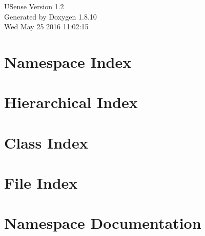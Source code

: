 \documentclass[twoside]{book}
\newcommand{\+}{\discretionary{\mbox{\scriptsize$\hookleftarrow$}}{}{}}
\newcommand{\clearemptydoublepage}{%
  \newpage{\pagestyle{empty}\cleardoublepage}%
}
\begin{document}
\hypersetup{pageanchor=false,
             bookmarks=true,
             bookmarksnumbered=true,
             pdfencoding=unicode
            }
\begin{titlepage}
\vspace*{7cm}
\begin{center}%
{\Large U\+Sense Version 1.2 }\\
\vspace*{1cm}
{\large Generated by Doxygen 1.8.10}\\
\vspace*{0.5cm}
{\small Wed May 25 2016 11:02:15}\\
\end{center}
\end{titlepage}
\clearemptydoublepage
\tableofcontents
\clearemptydoublepage
{}
\hypersetup{pageanchor=true}

\chapter{Namespace Index}

\chapter{Hierarchical Index}

\chapter{Class Index}

\chapter{File Index}

\chapter{Namespace Documentation}










\end{document}

